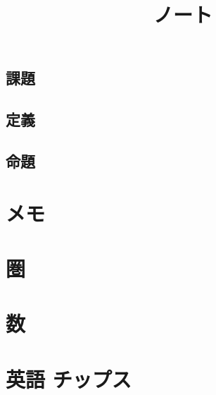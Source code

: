 \documentclass[6pt]{jreport}
\title{ノート}
\author{}
\begin{document}
\maketitle
\tableofcontents
\section*{課題}
\section*{定義}
\section*{命題}

\chapter{メモ}

%
%
%
%
%
%
%
%
%
%
%
%
%
%
%
%
%
%
%
\chapter{圏}
%

\chapter{数}

%
%
%
%
\chapter{英語 チップス}




\end{document}

